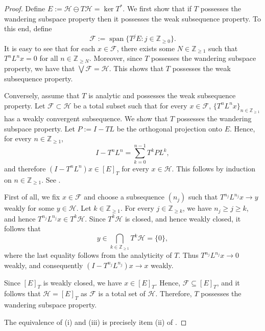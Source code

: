 \documentclass[11pt, reqno, a4paper]{amsart}
\theoremstyle{definition}
\newcommand{\calF}{{\mathcal{F}}}
\newcommand{\calH}{{\mathcal{H}}}
\renewcommand{\ge}{\geqslant}
\newcommand{\Z}{\mathbb Z}
\numberwithin{equation}{section}
\begin{document}
    \begin{proof}
    Define $ E:=\mathcal H\ominus T\mathcal H = \ker T^*$. We first show that if $T$ possesses the wandering subspace property then it possesses the weak subsequence property. To this end, define
    \begin{equation*}
        \calF := \operatorname{span} \{ T^j  E : j \in \Z_{\ge 0} \}.
    \end{equation*}
    It is easy to see that for each $x \in \calF$, there exists some $N \in \Z_{\ge 1}$ such that  $T^n L^n x = 0$ for all $n \in \Z_{\ge N}$. Moreover, since $T$ possesses the wandering subspace property, we have that $\bigvee \calF = \calH$. This shows that $T$ possesses the weak subsequence property.
    
    Conversely, assume that $T$ is analytic and possesses the weak subsequence property. Let $\mathcal F\subset\mathcal H$ be a total subset such that for every $x \in \calF$, $\{ T^n L^n x\}_{n \in \Z_{\ge 1}}$ has a weakly convergent subsequence. We show that $T$ possesses the wandering subspace property. Let $P:=I-TL$ be the orthogonal projection onto $ E$. Hence, for every $n\in \Z_{\ge 1}$,
    \begin{equation*}
    I-T^nL^n=\sum_{k=0}^{n-1}T^kPL^k,
    \end{equation*}
    and therefore $(I-T^nL^n)x\in [ E]_T$ for every $x\in\mathcal H$. This follows by induction on $n \in \Z_{\ge 1}$. See \cite[Equations (2.1) and (2.2)]{zbMATH01572594}.
    
    First of all, we fix $x\in\calF$ and choose a subsequence $(n_j)$ such that $T^{n_j}L^{n_j}x\to y$ weakly for some $y \in \calH$. Let $k\in\Z_{\ge1}$. For every $j\in\Z_{\ge k}$, we have $n_j\ge j\ge k$, and hence $T^{n_j}L^{n_j}x\in T^k\mathcal H$. Since $T^k\mathcal H$ is closed, and hence weakly closed, it follows that
    \begin{equation*}
    y\in\bigcap_{k\in \Z_{\ge 1}}T^k \mathcal H=\{0\},
    \end{equation*}
    where the last equality follows from the analyticity of $T$. Thus $T^{n_j}L^{n_j}x\to 0$ weakly, and consequently $(I-T^{n_j}L^{n_j})x\to x$ weakly.
    
    Since $[ E]_T$ is weakly closed, we have $x\in[ E]_T$. Hence, $\mathcal F\subseteq[ E]_T$, and it follows that $\mathcal H=[ E]_T$ as $\calF$ is a total set of $\calH$. Therefore, $T$ possesses the wandering subspace property.

    The equivalence of \rm{(i)} and \rm{(iii)} is precisely item \rm{(ii)} of .
    \end{proof}
\end{document}
